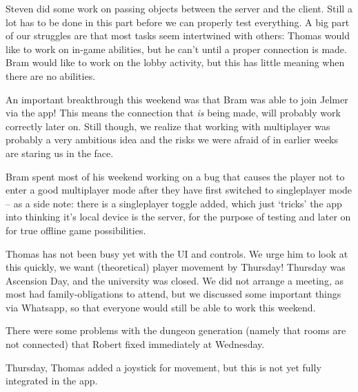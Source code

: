 \documentclass[../main.tex]{subfiles}
\begin{document}
Steven did some work on passing objects between the server and the client. Still a lot has to be done in this part before we can properly test everything. A big part of our struggles are that most tasks seem intertwined with others: Thomas would like to work on in-game abilities, but he can't until a proper connection is made. Bram would like to work on the lobby activity, but this has little meaning when there are no abilities.

An important breakthrough this weekend was that Bram was able to join Jelmer via the app! This means the connection that \textit{is} being made, will probably work correctly later on. Still though, we realize that working with multiplayer was probably a very ambitious idea and the risks we were afraid of in earlier weeks are staring us in the face.

Bram spent most of his weekend working on a bug that causes the player not to enter a good multiplayer mode after they have first switched to singleplayer mode -- as a side note: there is a singleplayer toggle added, which just `tricks' the app into thinking it's local device is the server, for the purpose of testing and later on for true offline game possibilities.

Thomas has not been busy yet with the UI and controls. We urge him to look at this quickly, we want (theoretical) player movement by Thursday!
\bigbreak\noindent
Thursday was Ascension Day, and the university was closed. We did not arrange a meeting, as most had family-obligations to attend, but we discussed some important things via Whatsapp, so that everyone would still be able to work this weekend.

There were some problems with the dungeon generation (namely that rooms are not connected) that Robert fixed immediately at Wednesday.

Thursday, Thomas added a joystick for movement, but this is not yet fully integrated in the app.
\end{document}
